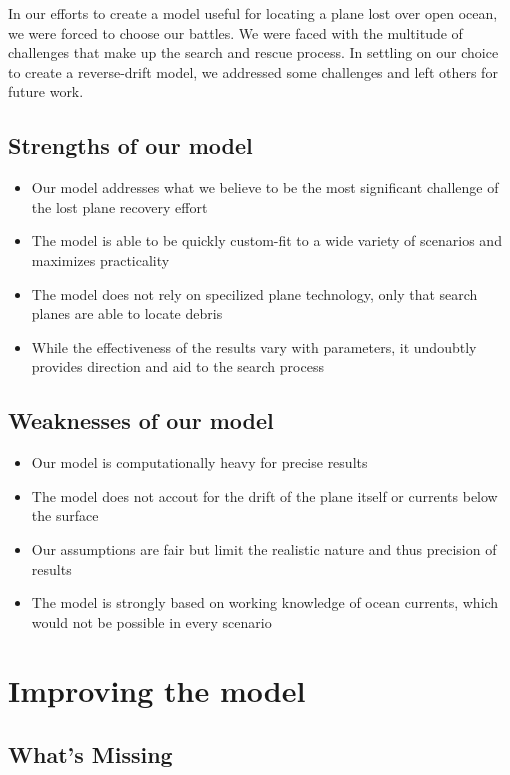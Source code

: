 \documentclass[pre,12pt]{revtex4-1}
\begin{document}
In our efforts to create a model useful for locating a plane lost over open ocean, we were forced to choose our battles. We were faced with the multitude of challenges that make up the search and rescue process. In settling on our choice to create a reverse-drift model, we addressed some challenges and left others for future work.

\subsection{Strengths of our model}

\begin{itemize}
\item Our model addresses what we believe to be the most significant challenge of the lost plane recovery effort
\item The model is able to be quickly custom-fit to a wide variety of scenarios and maximizes practicality
\item The model does not rely on specilized plane technology, only that search planes are able to locate debris
\item While the effectiveness of the results vary with parameters, it undoubtly provides direction and aid to the search process
\end{itemize}
\subsection{Weaknesses of our model}
\begin{itemize}
\item Our model is computationally heavy for precise results
\item The model does not accout for the drift of the plane itself or currents below the surface
\item Our assumptions are fair but limit the realistic nature and thus precision of results
\item The model is strongly based on working knowledge of ocean currents, which would not be possible in every scenario
\end{itemize}

\section{Improving the model}\label{Improving}

\subsection{What's Missing}\label{Missing}
\end{document}
